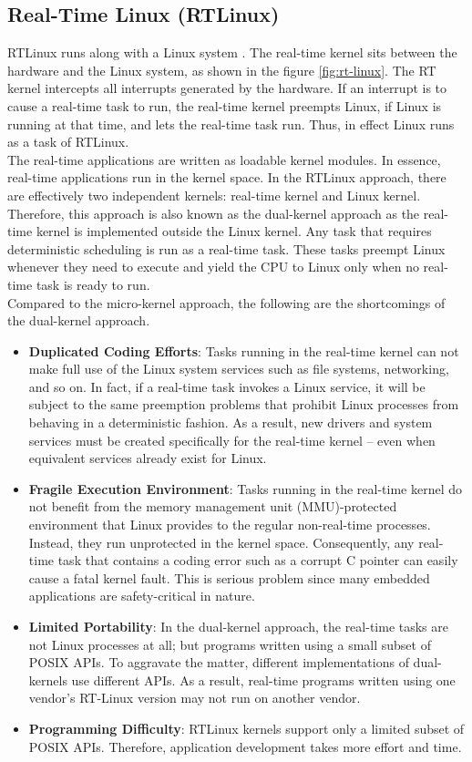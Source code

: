 \documentclass[12pt]{report}
\begin{document}
\subsection{Real-Time Linux (RTLinux)}
RTLinux runs along with a Linux system \cite{embd-rtlinux}. The real-time kernel sits between the hardware and the Linux system, as shown in the figure \ref{fig:rt-linux}. The RT kernel intercepts all interrupts generated by the hardware. If an interrupt is to cause a real-time task to run, the real-time kernel preempts Linux, if Linux is running at that time, and lets the real-time task run. Thus, in effect Linux runs as a task of RTLinux. \\

The real-time applications are written as loadable kernel modules. In essence, real-time applications run in the kernel space. In the RTLinux approach, there are effectively two independent kernels: real-time kernel and Linux kernel. Therefore, this approach is also known as the dual-kernel approach as the real-time kernel is implemented outside the Linux kernel. Any task that requires deterministic scheduling is run as a real-time task. These tasks preempt Linux whenever they need to execute and yield the CPU to Linux only when no real-time task is ready to run.\\ 

Compared to the micro-kernel approach, the following are the shortcomings of the dual-kernel approach.
\begin{itemize}
    \item \textbf{Duplicated Coding Efforts}: Tasks running in the real-time kernel can not make full use of the Linux system services such as file systems, networking, and so on. In fact, if a real-time task invokes a Linux service, it will be subject to the same preemption problems that prohibit Linux processes from behaving in a deterministic fashion. As a result, new drivers and system services must be created specifically for the real-time kernel – even when equivalent services already exist for Linux.
    \item \textbf{Fragile Execution Environment}: Tasks running in the real-time kernel do not benefit from the memory management unit (MMU)-protected environment that Linux provides to the regular non-real-time processes. Instead, they run unprotected in the kernel space. Consequently, any real-time task that contains a coding error such as a corrupt C pointer can easily cause a fatal kernel fault. This is serious problem since many embedded applications are safety-critical in nature.
    \item \textbf{Limited Portability}: In the dual-kernel approach, the real-time tasks are not Linux processes at all; but programs written using a small subset of POSIX APIs. To aggravate the matter, different implementations of dual-kernels use different APIs. As a result, real-time programs written using one vendor's RT-Linux version may not run on another vendor.
    \item \textbf{Programming Difficulty}: RTLinux kernels support only a limited subset of POSIX APIs. Therefore, application development takes more effort and time. 
\end{itemize}
\end{document}
